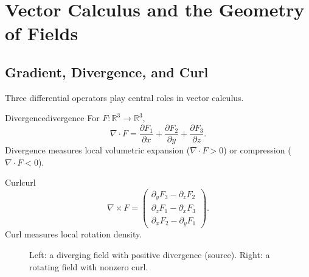 \documentclass[12pt,openany]{book}
\newcommand{\R}{\mathbb{R}}
\begin{document}
\chapter{Vector Calculus and the Geometry of Fields}
\label{ch:vecalc}

\section{Gradient, Divergence, and Curl}

Three differential operators play central roles in vector calculus.

\begin{definition}{Divergence}{divergence}
  For $F:\R^3\to\R^3$,
  \[
    \nabla\cdot F
    = \frac{\partial F_1}{\partial x}
    + \frac{\partial F_2}{\partial y}
    + \frac{\partial F_3}{\partial z}.
  \]
  Divergence measures local volumetric expansion ($\nabla\cdot F>0$) or
  compression ($\nabla\cdot F<0$).
\end{definition}

\begin{definition}{Curl}{curl}
  \[
    \nabla\times F
    = \begin{pmatrix}
        \partial_y F_3 - \partial_z F_2 \\
        \partial_z F_1 - \partial_x F_3 \\
        \partial_x F_2 - \partial_y F_1
      \end{pmatrix}.
  \]
  Curl measures local rotation density.
\end{definition}

\begin{figure}[H]
\centering
{}
\caption{Left: a diverging field with positive divergence (source). Right: a
rotating field with nonzero curl.}
\label{fig:div-curl}
\end{figure}
\end{document}
